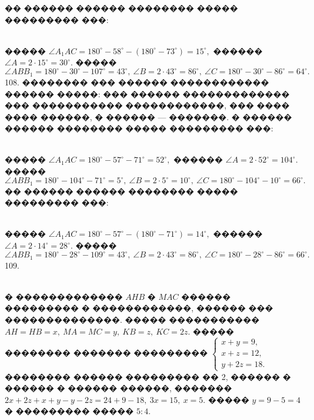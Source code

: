 \documentclass[12pt]{article}
\begin{document}
�� ������ ������ �������� ����� ��������� ���:
\begin{figure}[ht!]
\end{figure}\\
����� $\angle A_1AC=180^\circ-58^\circ-(180^\circ-73^\circ)=15^\circ,$ ������ $\angle A=2\cdot15^\circ=30^\circ.$ ����� $\angle ABB_1=180^\circ-30^\circ-107^\circ=43^\circ,\ \angle B=2\cdot43^\circ=86^\circ,\ \angle C=180^\circ-30^\circ-86^\circ=64^\circ.$\\
108. �������� ��� ������ ������������ ������ �����: ��� ������ ������������� ��� ����������� ������������, ��� ���� ���� ������, � ������ --- �������. � ������ ������ �������� ����� ��������� ���:
\begin{figure}[ht!]
\end{figure}\\
����� $\angle A_1AC=180^\circ-57^\circ-71^\circ=52^\circ,$ ������ $\angle A=2\cdot52^\circ=104^\circ.$ ����� $\angle ABB_1=180^\circ-104^\circ-71^\circ=5^\circ,\ \angle B=2\cdot5^\circ=10^\circ,\ \angle C=180^\circ-104^\circ-10^\circ=66^\circ.$\\
�� ������ ������ �������� ����� ��������� ���:\\
\begin{figure}[ht!]
\end{figure}\\
����� $\angle A_1AC=180^\circ-57^\circ-(180^\circ-71^\circ)=14^\circ,$ ������ $\angle A=2\cdot14^\circ=28^\circ.$ ����� $\angle ABB_1=180^\circ-28^\circ-109^\circ=43^\circ,\ \angle B=2\cdot43^\circ=86^\circ,\ \angle C=180^\circ-28^\circ-86^\circ=66^\circ.$\\
109. \begin{figure}[ht!]
\end{figure}\\
� ������������� $AHB$ � $MAC$ ������ ��������� � ������������, ������ ��� ��������������. ����� ����������� $AH=HB=x,\ MA=MC=y,\ KB=z,\ KC=2z.$ ����� �������� ������� ��������� $\begin{cases} x+y=9,\\ x+z=12,\\ y+2z=18.\end{cases}$ �������� ������ ��������� �� 2, ������ � ������ � ������ ������, ������� $2x+2z+x+y-y-2z=24+9-18,\ 3x=15,\ x=5.$ ����� $y=9-5=4$ � ��������� ����� $5:4.$\\
\end{document}
